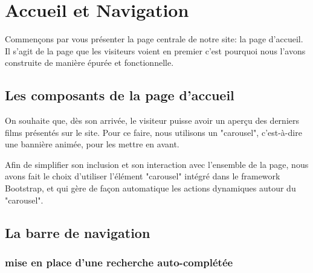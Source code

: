 \chapter{Accueil et Navigation}

    Commençons par vous présenter la page centrale de notre site: la page d'accueil. Il s'agit de la page que les visiteurs voient en premier c'est pourquoi nous l'avons construite de manière épurée et fonctionnelle. 

    \medskip

    \section{Les composants de la page d'accueil}
        
        On souhaite que, dès son arrivée, le visiteur puisse avoir un aperçu des derniers films présentés sur le site. Pour ce faire, nous utilisons un "carousel", c'est-à-dire une bannière animée, pour les mettre en avant. 

        Afin de simplifier son inclusion et son interaction avec l'ensemble de la page, nous avons fait le choix d'utiliser l'élément "carousel" intégré dans le framework Bootstrap, et qui gère de façon automatique les actions dynamiques autour du "carousel".


        \medskip


    \section{La barre de navigation}

        \subsection{mise en place d'une recherche auto-complétée}


